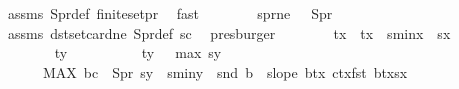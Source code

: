 \begin{isabellebody}
\ assms{\isacharparenleft}{\kern0pt}{}{\isacharparenright}{\kern0pt}\ S{}pr{\isacharunderscore}{\kern0pt}def\ finite{\isacharunderscore}{\kern0pt}set{\isacharunderscore}{\kern0pt}pr\ \isamarkupfalse%
\ fast\isanewline
\ \ \ \ \ \ \isamarkupfalse%
\ s{}pr{\isacharunderscore}{\kern0pt}ne{\isacharcolon}{\kern0pt}\ \ \ {\isachardoublequoteopen}S{}pr\ {\isasymnoteq}\ {\isacharbraceleft}{\kern0pt}{\isacharbraceright}{\kern0pt}{\isachardoublequoteclose}\ \isamarkupfalse%
\ assms{\isacharparenleft}{\kern0pt}{}{\isacharcomma}{\kern0pt}{}{\isacharparenright}{\kern0pt}\ dst{\isacharunderscore}{\kern0pt}set{\isacharunderscore}{\kern0pt}card{}{\isacharunderscore}{\kern0pt}ne\ S{}pr{\isacharunderscore}{\kern0pt}def\ s{}{\isacharunderscore}{\kern0pt}c{}\ \isamarkupfalse%
\ presburger\isanewline
\isanewline
\ \ \ \ \ \ \isamarkupfalse%
\ tx\ \ {\isachardoublequoteopen}tx\ {\isacharequal}{\kern0pt}\ {\isacharminus}{\kern0pt}s{}{\isacharunderscore}{\kern0pt}minx\ {\isacharplus}{\kern0pt}\ s{}x\ {\isacharplus}{\kern0pt}\ {}{\isachardoublequoteclose}\isanewline
\ \ \ \ \ \ \isamarkupfalse%
\ ty{}\ \ \isanewline
\ \ \ \ \ \ \ \ {\isachardoublequoteopen}ty{}\ {\isacharequal}{\kern0pt}\ \ max\ s{}y\ \isanewline
\ \ \ \ \ \ {\isacharparenleft}{\kern0pt}MAX\ {\isacharparenleft}{\kern0pt}b{\isacharcomma}{\kern0pt}c{\isacharparenright}{\kern0pt}\ {\isasymin}\ S{}pr{\isachardot}{\kern0pt}\ s{}y\ {\isacharplus}{\kern0pt}\ s{}{\isacharunderscore}{\kern0pt}miny\ {\isacharminus}{\kern0pt}\ snd\ b\ {\isacharplus}{\kern0pt}\ {\isacharparenleft}{\kern0pt}slope\ {\isacharparenleft}{\kern0pt}b{\isacharplus}{\kern0pt}{\isacharparenleft}{\kern0pt}tx{\isacharcomma}{\kern0pt}{}{\isacharparenright}{\kern0pt}{\isacharparenright}{\kern0pt}\ {\isacharparenleft}{\kern0pt}c{\isacharplus}{\kern0pt}{\isacharparenleft}{\kern0pt}tx{\isacharcomma}{\kern0pt}{}{\isacharparenright}{\kern0pt}{\isacharparenright}{\kern0pt}{\isacharparenright}{\kern0pt}{\isacharasterisk}{\kern0pt}{\isacharparenleft}{\kern0pt}fst\ b{\isacharplus}{\kern0pt}tx{\isacharminus}{\kern0pt}s{}x{\isacharparenright}{\kern0pt}{\isacharparenright}{\kern0pt}{\isachardoublequoteclose}\isanewline
\isanewline
\ \ \ \ \ \ \isamarkupfalse%

\end{isabellebody}
